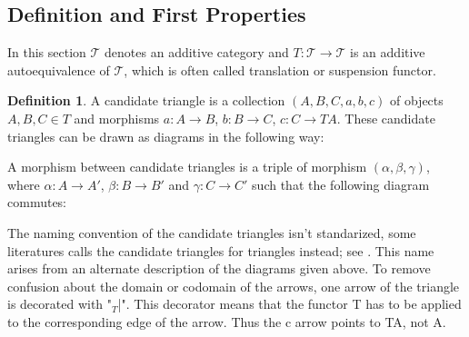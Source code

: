 \documentclass[11pt]{article}
\theoremstyle{definition}
\newtheorem{definition}{Definition}[section]
\theoremstyle{remark}
\begin{document}
        \subsection{Definition and First Properties}
            In this section $\mathcal{T}$ denotes an additive category and $T:\mathcal{T}\rightarrow\mathcal{T}$ is an additive autoequivalence of $\mathcal{T}$, which is often called translation or suspension functor.
            \begin{definition}
                A candidate triangle is a collection $(A,B,C,a,b,c)$ of objects \\ $A,B,C\in T$ and morphisms $a:A\rightarrow B$, $b:B\rightarrow C$, $c:C\rightarrow TA$. These candidate triangles can be drawn as diagrams in the following way:

                \begin{center}
                \end{center}

                A morphism between candidate triangles is a triple of morphism $(\alpha, \beta, \gamma)$, where $\alpha : A \rightarrow A'$, $\beta : B \rightarrow B'$ and $\gamma : C \rightarrow C'$ such that the following diagram commutes:

            \begin{center}
            \end{center}

            \end{definition}

            The naming convention of the candidate triangles isn't standarized, some literatures calls the candidate triangles for triangles instead; see \cite{keller}. This name arises from an alternate description of the diagrams given above. To remove confusion about the domain or codomain of the arrows, one arrow of the triangle is decorated with "$_T$|". This decorator means that the functor T has to be applied to the corresponding edge of the arrow. Thus the c arrow points to TA, not A.
\end{document}
